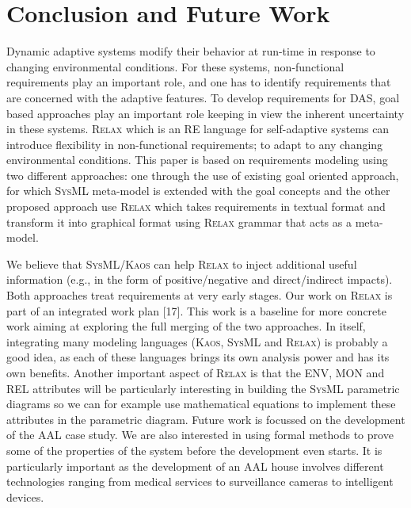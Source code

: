 \documentclass[10pt, conference, compsocconf]{IEEEtran}
\def\myrelax{\textsc{Relax}}                  %
\def\sysml{\textsc{SysML}}
\def\kaos{\textsc{Kaos}}
\begin{document}
\section{Conclusion and Future Work}\label{sec:Conclusion and Future Work}

Dynamic adaptive systems modify their behavior at run-time in response to changing environmental conditions. For these systems, non-functional requirements play an important role, and one has to identify requirements that are concerned with the adaptive features. To develop requirements for DAS, goal based approaches play an important role keeping in view the inherent uncertainty in these systems. \myrelax{} which is an RE language for self-adaptive systems can introduce flexibility in non-functional requirements; to adapt to any changing environmental conditions. This paper is based on requirements modeling using two different approaches: one through the use of existing goal oriented approach, for which \sysml{} meta-model is extended with the goal concepts and the other proposed approach use \myrelax{} which takes requirements in textual format and transform it into graphical format using \myrelax{} grammar that acts as a meta-model. 

We believe that \sysml{}/\kaos{} can help \myrelax{} to inject additional useful information (e.g., in the form of positive/negative and direct/indirect impacts). Both approaches treat requirements at very early stages. Our work on \myrelax{} is part of an integrated work plan [17]. This work is a baseline for more concrete work aiming at exploring the full merging of the two approaches. In itself, integrating many modeling languages (\kaos, \sysml{} and \myrelax{}) is probably a good idea, as each of these languages brings its own analysis power and has its own benefits. Another important aspect of \myrelax{} is that the ENV, MON and REL attributes will be particularly interesting in building the \sysml{} parametric diagrams so we can for example use mathematical equations to implement these attributes in the parametric diagram. Future work is focussed on the development of the AAL case study. We are also interested in using formal methods \cite{test18} to prove some of the properties of the system before the development even starts. It is particularly important as the development of an AAL house involves different technologies ranging from medical services to surveillance cameras to intelligent devices.
\end{document}
